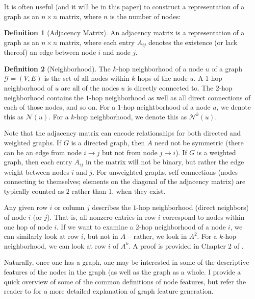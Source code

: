 \documentclass{article}
\theoremstyle{definition}
\newtheorem{definition}{Definition}[section]
\begin{document}
It is often useful (and it will be in this paper) to construct a representation of a graph as an $n \times n$ matrix, where $n$ is the number of nodes:

\begin{definition}[Adjacency Matrix]
An adjacency matrix is a representation of a graph as an $n \times n$ matrix, where each entry $A_{ij}$ denotes the existence (or lack thereof) an edge between node $i$ and node $j$. 
\end{definition}

\begin{definition}[Neighborhood]
The $k$-hop neighborhood of a node $u$ of a graph $\mathcal{G} = (V, E)$ is the set of all nodes within $k$ hops of the node $u$. A $1$-hop neighborhood of $u$ are all of the nodes $u$ is directly connected to. The $2$-hop neighborhood contains the $1$-hop neighborhood as well as all direct connections of each of those nodes, and so on. For a $1$-hop neightborhood of a node $u$, we denote this as $\mathcal{N}(u)$. For a $k$-hop neighborhood, we denote this as $\mathcal{N}^k(u)$.
\end{definition}

Note that the adjacency matrix can encode relationships for both directed and weighted graphs. If $G$ is a directed graph, then $A$ need not be symmetric (there can be an edge from node $i \rightarrow j$ but not from node $j \rightarrow i$). If $G$ is a weighted graph, then each entry $A_{ij}$ in the matrix will not be binary, but rather the edge weight between nodes $i$ and $j$. For unweighted graphs, self connections (nodes connecting to themselves; elements on the diagonal of the adjacency matrix) are typically counted as $2$ rather than $1$, when they exist.

Any given row $i$ or column $j$ describes the $1$-hop neighborhood (direct neighbors) of node $i$ (or $j$). That is, all nonzero entries in row $i$ correspond to nodes within one hop of node $i$. If we want to examine a $2$-hop neighborhood of a node $i$, we can similarly look at row $i$, but not in $A$ -- rather, we look in $A^2$. For a $k$-hop neighborhood, we can look at row $i$ of $A^k$. A proof is provided in Chapter 2 of \cite{hamiltonGRL}.

Naturally, once one has a graph, one may be interested in some of the descriptive features of the nodes in the graph (as well as the graph as a whole. I provide a quick overview of some of the common definitions of node features, but refer the reader to \cite{mdpiGraphFeatureSurvey} for a more detailed explanation of graph feature generation.
\end{document}
